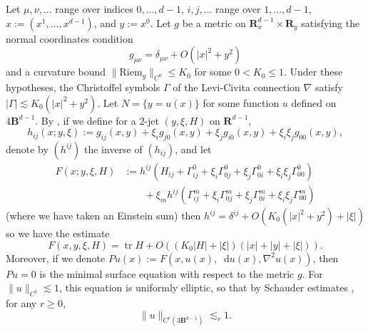 \documentclass[reqno,11pt]{amsart}
\newcommand{\RR}{\mathbf{R}}
\newcommand{\Ball}{\mathbf{B}}
\newcommand*\dif{\mathop{}\!\mathrm{d}}
\DeclareMathOperator{\tr}{tr}
\newcommand{\Riem}{\mathrm{Riem}}
\theoremstyle{definition}
\numberwithin{equation}{section}
\begin{document}
Let $\mu, \nu, \dots$ range over indices $0, \dots, d - 1$, $i, j, \dots$ range over $1, \dots, d - 1$, $x := (x^1, \dots, x^{d - 1})$, and $y := x^0$.
Let $g$ be a metric on $\RR^{d - 1}_x \times \RR_y$ satisfying the normal coordinates condition 
$$g_{\mu\nu} = \delta_{\mu\nu} + O(|x|^2 + y^2)$$
and a curvature bound $\|\Riem_g\|_{C^0} \leq K_0$ for some $0 < K_0 \leq 1$.
Under these hypotheses, the Christoffel symbols $\Gamma$ of the Levi-Civita connection $\nabla$ satisfy $|\Gamma| \lesssim K_0(|x|^2 + y^2)$.
Let $N = \{y = u(x)\}$ for some function $u$ defined on $4\Ball^{d - 1}$.
By \cite[(7.21)]{colding2011course}, if we define for a $2$-jet $(y, \xi, H)$ on $\RR^{d - 1}$,
$$h_{ij}(x; y, \xi) := g_{ij}(x, y) + \xi_i g_{j0}(x, y) + \xi_j g_{i0}(x, y) + \xi_i \xi_j g_{00}(x, y),$$
denote by $(h^{ij})$ the inverse of $(h_{ij})$, and let
\begin{align*}
	F(x; y, \xi, H) 
	&:= h^{ij}(H_{ij} + \Gamma^0_{ij} + \xi_i \Gamma^0_{0j} + \xi_j \Gamma^0_{0i} + \xi_i \xi_j \Gamma^0_{00}) \\
	&\qquad + \xi_m h^{ij}(\Gamma^m_{ij} + \xi_i \Gamma^m_{0j} + \xi_j \Gamma^m_{0i} + \xi_i \xi_j \Gamma^m_{00})
\end{align*}
(where we have taken an Einstein sum)
then $h^{ij} = \delta^{ij} + O(K_0(|x|^2 + y^2) + |\xi|)$ so we have the estimate
$$F(x, y, \xi, H) = \tr H + O((K_0 |H| + |\xi|)(|x| + |y| + |\xi|)).$$
Moreover, if we denote $Pu(x) := F(x, u(x), \dif u(x), \nabla^2 u(x))$, then $Pu = 0$ is the minimal surface equation with respect to the metric $g$.
For $\|u\|_{C^1} \lesssim 1$, this equation is uniformly elliptic, so that by Schauder estimates \cite[Theorem 6.2]{gilbarg2015elliptic}, for any $r \geq 0$,
\begin{equation}\label{norms on uk}
	\|u\|_{C^r(3\Ball^{d - 1})} \lesssim_r 1.
\end{equation}
\end{document}
